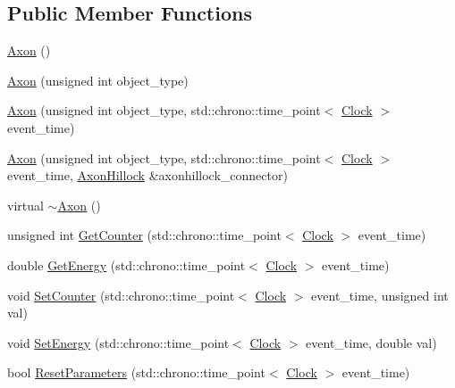 \subsection*{Public Member Functions}
\begin{DoxyCompactItemize}
\item 
\mbox{\hyperlink{classAxon_a1a0703b026b74c83e418613d929c5d22}{Axon}} ()
\item 
\mbox{\hyperlink{classAxon_a7cc05238af77735983111d1ca58c9c9b}{Axon}} (unsigned int object\+\_\+type)
\item 
\mbox{\hyperlink{classAxon_a0ca4cd87ad4a2719c6b7c8c3d46dcbc6}{Axon}} (unsigned int object\+\_\+type, std\+::chrono\+::time\+\_\+point$<$ \mbox{\hyperlink{universe_8h_a0ef8d951d1ca5ab3cfaf7ab4c7a6fd80}{Clock}} $>$ event\+\_\+time)
\item 
\mbox{\hyperlink{classAxon_afaffed720efb3cb75e46088c5fb81d95}{Axon}} (unsigned int object\+\_\+type, std\+::chrono\+::time\+\_\+point$<$ \mbox{\hyperlink{universe_8h_a0ef8d951d1ca5ab3cfaf7ab4c7a6fd80}{Clock}} $>$ event\+\_\+time, \mbox{\hyperlink{classAxonHillock}{Axon\+Hillock}} \&axonhillock\+\_\+connector)
\item 
virtual \mbox{\hyperlink{classAxon_af000507f0ff0527d1743e90d2e756282}{$\sim$\+Axon}} ()
\item 
unsigned int \mbox{\hyperlink{classAxon_a390ff1f3d85034fc85bcafc7374da9c7}{Get\+Counter}} (std\+::chrono\+::time\+\_\+point$<$ \mbox{\hyperlink{universe_8h_a0ef8d951d1ca5ab3cfaf7ab4c7a6fd80}{Clock}} $>$ event\+\_\+time)
\item 
double \mbox{\hyperlink{classAxon_a37a1ca2b0454d77dc0bc93e493feb0ce}{Get\+Energy}} (std\+::chrono\+::time\+\_\+point$<$ \mbox{\hyperlink{universe_8h_a0ef8d951d1ca5ab3cfaf7ab4c7a6fd80}{Clock}} $>$ event\+\_\+time)
\item 
void \mbox{\hyperlink{classAxon_a3493cb97bde26bd66facc6084cd5f219}{Set\+Counter}} (std\+::chrono\+::time\+\_\+point$<$ \mbox{\hyperlink{universe_8h_a0ef8d951d1ca5ab3cfaf7ab4c7a6fd80}{Clock}} $>$ event\+\_\+time, unsigned int val)
\item 
void \mbox{\hyperlink{classAxon_af5108f451de97deb56138e8e81ced359}{Set\+Energy}} (std\+::chrono\+::time\+\_\+point$<$ \mbox{\hyperlink{universe_8h_a0ef8d951d1ca5ab3cfaf7ab4c7a6fd80}{Clock}} $>$ event\+\_\+time, double val)
\item 
bool \mbox{\hyperlink{classAxon_ae079e0b47f5027625da158930e4fa9c5}{Reset\+Parameters}} (std\+::chrono\+::time\+\_\+point$<$ \mbox{\hyperlink{universe_8h_a0ef8d951d1ca5ab3cfaf7ab4c7a6fd80}{Clock}} $>$ event\+\_\+time)

\end{DoxyCompactItemize}

